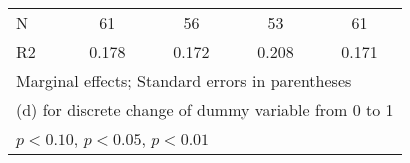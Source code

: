 {\begin{tabular}{l*{4}{c}}
\hline
N                   &          61         &          56         &          53         &          61         \\
R2                  &       0.178         &       0.172         &       0.208         &       0.171         \\
\hline\hline
\multicolumn{5}{l}{\footnotesize Marginal effects; Standard errors in parentheses}\\
\multicolumn{5}{l}{\footnotesize  (d) for discrete change of dummy variable from 0 to 1}\\
\multicolumn{5}{l}{\footnotesize \sym{*} \(p<0.10\), \sym{**} \(p<0.05\), \sym{***} \(p<0.01\)}\\
\end{tabular}
}
